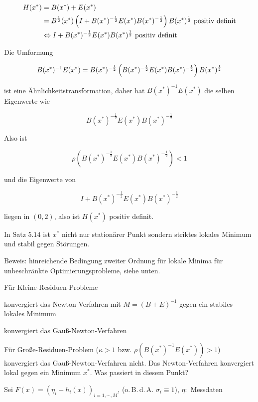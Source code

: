 \begin{align*}
 H(x^*) &= B(x^*) + E(x^*) \\
&= B^{\frac 12} (x^*) \left(I + B(x^*)^{-\frac 12} E(x^*)  B(x^*)^{-\frac 12} \right) B(x^*)^{\frac 12} \text{ positiv definit} \\
&\Leftrightarrow I + B(x^*)^{-\frac 12} E(x^*) B(x^*)^{\frac 12} \text{ positiv definit} \\
 \end{align*}

Die Umformung

\[B(x^*)^{-1} E(x^*) = B(x^*)^{-\frac 12} \left(B(x^*)^{-\frac 12} E(x^*) B(x^*)^{-\frac 12} \right) B(x^*)^{\frac 12} \]

ist eine Ähnlichkeitstransformation, daher hat $B(x^*)^{-1} E(x^*)$ die selben Eigenwerte wie

\[ B(x^*)^{-\frac 12} E(x^*) B(x^*)^{-\frac 12} \]

Also ist

\[ \rho (B(x^*)^{-\frac 12} E(x^*) B(x^*)^{-\frac 12} ) < 1 \]

und die Eigenwerte von

\[ I + B(x^*)^{-\frac 12} E(x^*) B(x^*)^{-\frac 12} \]

liegen in $(0,2)$, also ist $H(x^*)$ positiv definit.


In Satz $5.14$ ist $x^*$ nicht nur stationärer Punkt sondern striktes lokales Minimum und stabil gegen Störungen.

Beweis: hinreichende Bedingung zweiter Ordnung für lokale Minima für unbeschränkte Optimierungsprobleme, siehe unten.


Für Kleine-Residuen-Probleme

\bitm
\item konvergiert das Newton-Verfahren mit $M = (B+E)^{-1}$ gegen ein stabiles lokales Minimum 
\item konvergiert das Gauß-Newton-Verfahren
\eitm

Für Große-Residuen-Problem ($\kappa>1$ bzw. $\rho (B(x^*)^{-1} E(x^*)) > 1$) konvergiert das Gauß-Newton-Verfahren nicht. Das Newton-Verfahren konvergiert lokal gegen ein Minimum $x^*$. Was passiert in diesem Punkt?


Sei $F(x) = ( \eta_i - h_i(x))_{i=1,\cdots,M}$, (o.\,B.\,d.\,A. $\sigma_i \equiv 1$), $\eta:$ Messdaten

